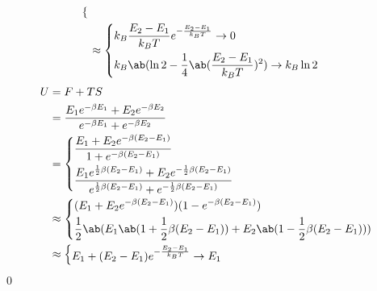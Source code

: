 \documentclass[uplatex,diffipdfmx,a4paper,11pt]{jlreq}
\makeatletter
\theoremstyle{definition}
\renewenvironment{proof}[1][\proofname]{\par
  \normalfont
  \topsep6\p@\@plus6\p@ \trivlist
  \item[\hskip\labelsep{\bfseries #1}\@addpunct{\bfseries}]\ignorespaces\quad\par
}{%
  \qed\endtrivlist\@endpefalse
}
\renewcommand\proofname{証明}
\makeatother
\begin{document}
\begin{proof}
\begin{align}
\begin{dcases}
    \end{dcases}                                                                                                                                                                                                                        \\
      & \approx
    \begin{dcases}
      k_B \frac{E_2 - E_1}{k_BT}e^{- \frac{E_2 - E_1}{k_BT}} \to 0          \\
      k_B\ab(\ln 2 - \frac{1}{4}\ab(\frac{E_2 - E_1}{k_BT})^2) \to k_B\ln 2 \\
    \end{dcases}
  \end{align}
  \begin{align}
    U & = F + TS                                                                                                                                                                                      \\
      & = \frac{E_1e^{-\beta E_1} + E_2e^{-\beta E_2}}{e^{-\beta E_1} + e^{-\beta E_2}}                                                                                                               \\
      & = \begin{dcases}
            \frac{E_1 + E_2e^{-\beta (E_2 - E_1)}}{1 + e^{-\beta (E_2 - E_1)}}                                                                                      \\
            \frac{E_1e^{\frac{1}{2}\beta (E_2 - E_1)} + E_2e^{-\frac{1}{2}\beta (E_2 - E_1)}}{e^{\frac{1}{2}\beta (E_2 - E_1)} + e^{-\frac{1}{2}\beta (E_2 - E_1)}} \\
          \end{dcases} \\
      & \approx \begin{dcases}
                  (E_1 + E_2e^{-\beta (E_2 - E_1)})(1 - e^{-\beta (E_2 - E_1)})                                       \\
                  \frac{1}{2}\ab(E_1\ab(1 + \frac{1}{2}\beta (E_2 - E_1)) + E_2\ab(1 - \frac{1}{2}\beta (E_2 - E_1))) \\
                \end{dcases}                                                                             \\
      & \approx \begin{dcases}
                  E_1 + (E_2 - E_1)e^{- \frac{E_2 - E_1}{k_BT}} \to E_1                                     \\

\end{dcases}
\end{align}
\end{proof}
\end{document}
